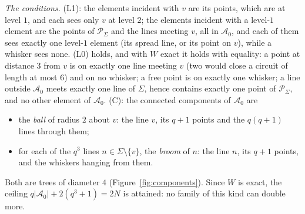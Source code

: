 \documentclass[11pt]{amsart}
\theoremstyle{definition}
\theoremstyle{remark}
\newcommand{\cA}{\mathcal{A}}
\newcommand{\PS}{\mathcal{P}_{\Sigma}}
\begin{document}
\emph{The conditions.} (L1): the elements incident with $v$ are its points, which are at level $1$, and each sees only $v$ at level $2$; the elements incident with a level-$1$ element are the points of $\PS$ and the lines meeting $v$, all in $\cA_0$, and each of them sees exactly one level-$1$ element (its spread line, or its point on $v$), while a whisker sees none. (L0) holds, and with $W$ exact it holds with equality: a point at distance $3$ from $v$ is on exactly one line meeting $v$ (two would close a circuit of length at most $6$) and on no whisker; a free point is on exactly one whisker; a line outside $\cA_0$ meets exactly one line of $\Sigma$, hence contains exactly one point of $\PS$, and no other element of $\cA_0$. (C): the connected components of $\cA_0$ are
\begin{itemize}[leftmargin=1.5em]
\item the \emph{ball} of radius $2$ about $v$: the line $v$, its $q+1$ points and the $q(q+1)$ lines through them;
\item for each of the $q^3$ lines $n\in \Sigma\setminus\{v\}$, the \emph{broom} of $n$: the line $n$, its $q+1$ points, and the whiskers hanging from them.
\end{itemize}
Both are trees of diameter $4$ (Figure~\ref{fig:components}). Since $W$ is exact, the ceiling $q|\cA_0|+2(q^3+1)=2N$ is attained: no family of this kind can double more.
\end{document}

